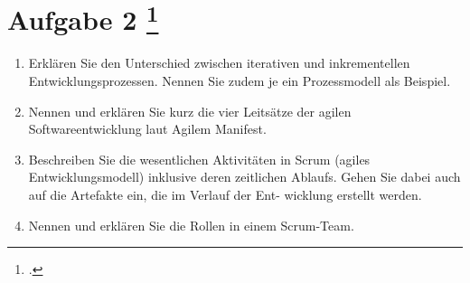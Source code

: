\documentclass{lehramt-informatik-aufgabe}
\begin{document}
\section{Aufgabe 2
\footcite{66116:2021:03}}

\begin{enumerate}

\item Erklären Sie den Unterschied zwischen iterativen und
inkrementellen Entwicklungsprozessen. Nennen Sie zudem je ein
Prozessmodell als Beispiel.


\item Nennen und erklären Sie kurz die vier Leitsätze der agilen
Softwareentwicklung laut Agilem Manifest.


\item Beschreiben Sie die wesentlichen Aktivitäten in Scrum (agiles
Entwicklungsmodell) inklusive deren zeitlichen Ablaufs. Gehen Sie dabei
auch auf die Artefakte ein, die im Verlauf der Ent- wicklung erstellt
werden.


\item Nennen und erklären Sie die Rollen in einem Scrum-Team.
\end{enumerate}
\end{document}
